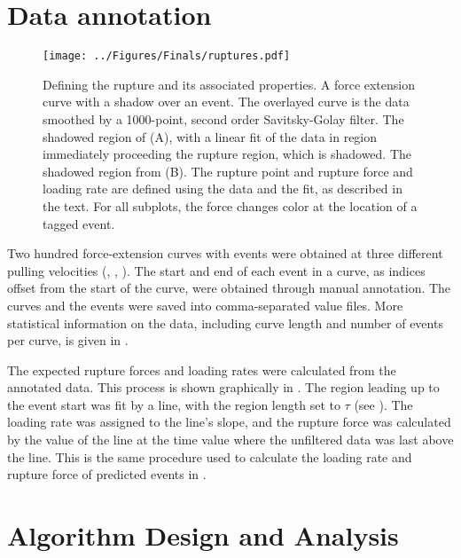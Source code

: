 \section{Data annotation}


\begin{figure}[htpb]
\caption[Definition of rupture force and loading rate]{ Defining the rupture and its associated properties.  A force extension curve with a shadow over an event. The overlayed curve is the data smoothed by a 1000-point, second order Savitsky-Golay filter.  The shadowed region of (A), with a linear fit of the data in region immediately proceeding the rupture region, which is shadowed.  The shadowed region from (B). The rupture point and rupture force and loading rate are defined using the data and the fit, as described in the text. For all subplots, the force changes color at the location of a tagged event. }
\centering
\texttt{[image: ../Figures/Finals/ruptures.pdf]}%
\end{figure}

Two hundred force-extension curves with events were obtained at three different pulling velocities (, , ). The start and end of each event in a curve, as indices offset from the start of the curve, were obtained through manual annotation. The curves and the events were saved into comma-separated value files. More statistical information on the data, including curve length and number of events per curve, is given in .

The expected rupture forces and loading rates were calculated from the annotated data. This process is shown graphically in . The region leading up to the event start was fit by a line, with the region length set to $\tau$ (see ). The loading rate was assigned to the line's slope, and the rupture force was calculated by the value of the line at the time value where the unfiltered data was last above the line. This is the same procedure used to calculate the loading rate and rupture force of predicted events in . 



\section{Algorithm Design and Analysis}

